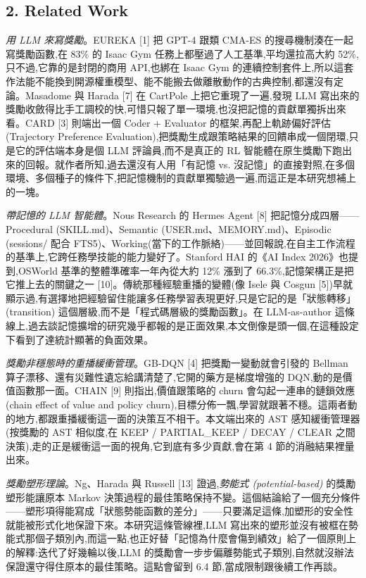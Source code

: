 \subsection{2. Related Work}\label{2-related-work}

\emph{用 LLM 來寫獎勵}。EUREKA {[}1{]} 把 GPT-4 跟類 CMA-ES 的搜尋機制湊在一起寫獎勵函數,在 83\% 的 Isaac Gym 任務上都壓過了人工基準,平均還拉高大約 52\%,只不過,它靠的是封閉的商用 API,也綁在 Isaac Gym 的連續控制套件上,所以這套作法能不能換到開源權重模型、能不能搬去做離散動作的古典控制,都還沒有定論。Masadome 與 Harada {[}7{]} 在 CartPole 上把它重現了一遍,發現 LLM 寫出來的獎勵收斂得比手工調校的快,可惜只報了單一環境,也沒把記憶的貢獻單獨拆出來看。CARD {[}3{]} 則端出一個 Coder + Evaluator 的框架,再配上軌跡偏好評估 (Trajectory Preference Evaluation),把獎勵生成跟策略結果的回饋串成一個閉環,只是它的評估端本身是個 LLM 評論員,而不是真正的 RL 智能體在原生獎勵下跑出來的回報。就作者所知,過去還沒有人用「有記憶 vs. 沒記憶」的直接對照,在多個環境、多個種子的條件下,把記憶機制的貢獻單獨驗過一遍,而這正是本研究想補上的一塊。

\emph{帶記憶的 LLM 智能體}。Nous Research 的 Hermes Agent {[}8{]} 把記憶分成四層------Procedural (SKILL.md)、Semantic (USER.md、MEMORY.md)、Episodic (sessions/ 配合 FTS5)、Working(當下的工作脈絡)------並回報說,在自主工作流程的基準上,它跨任務學技能的能力變好了。Stanford HAI 的《AI Index 2026》也提到,OSWorld 基準的整體準確率一年內從大約 12\% 漲到了 66.3\%,記憶架構正是把它推上去的關鍵之一 {[}10{]}。傳統那種經驗重播的變體(像 Isele 與 Cosgun {[}5{]})早就顯示過,有選擇地把經驗留住能讓多任務學習表現更好,只是它記的是「狀態轉移」(transition) 這個層級,而不是「程式碼層級的獎勵函數」。在 LLM-as-author 這條線上,過去談記憶擴增的研究幾乎都報的是正面效果,本文倒像是頭一個,在這種設定下看到了達統計顯著的負面效果。

\emph{獎勵非穩態時的重播緩衝管理}。GB-DQN {[}4{]} 把獎勵一變動就會引發的 Bellman 算子漂移、還有災難性遺忘給講清楚了,它開的藥方是梯度增強的 DQN,動的是價值函數那一面。CHAIN {[}9{]} 則指出,價值跟策略的 churn 會勾起一連串的鏈鎖效應 (chain effect of value and policy churn),目標分佈一飄,學習就跟著不穩。這兩者動的地方,都跟重播緩衝這一面的決策互不相干。本文端出來的 AST 感知緩衝管理器(按獎勵的 AST 相似度,在 KEEP / PARTIAL\_KEEP / DECAY / CLEAR 之間決策),走的正是緩衝這一面的視角,它到底有多少貢獻,會在第 4 節的消融結果裡量出來。

\emph{獎勵塑形理論}。Ng、Harada 與 Russell {[}13{]} 證過,\emph{勢能式 (potential-based)} 的獎勵塑形能讓原本 Markov 決策過程的最佳策略保持不變。這個結論給了一個充分條件------塑形項得能寫成「狀態勢能函數的差分」------只要滿足這條,加塑形的安全性就能被形式化地保證下來。本研究這條管線裡,LLM 寫出來的塑形並沒有被框在勢能式那個子類別內,而這一點,也正好替「記憶為什麼會傷到績效」給了一個原則上的解釋:迭代了好幾輪以後,LLM 的獎勵會一步步偏離勢能式子類別,自然就沒辦法保證還守得住原本的最佳策略。這點會留到 6.4 節,當成限制跟後續工作再談。

